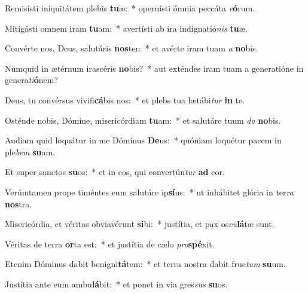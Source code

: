 \item Remisísti iniquitátem plebis \textbf{tu}æ:~* operuísti ómnia peccáta \textit{e}\textbf{ó}rum.
\item Mitigásti omnem iram \textbf{tu}am:~* avertísti ab ira indignatió\textit{nis} \textbf{tu}æ.
\item Convérte nos, Deus, salutáris \textbf{nos}ter:~* et avérte iram tuam \textit{a} \textbf{no}bis.
\item Numquid in ætérnum irascéris \textbf{no}bis?~* aut exténdes iram tuam a generatióne in genera\textit{ti}\textbf{ó}nem?
\item Deus, tu convérsus vivifi\textbf{cá}bis nos:~* et plebs tua lætábi\textit{tur} \textbf{in} te.
\item Osténde nobis, Dómine, misericórdiam \textbf{tu}am:~* et salutáre tuum \textit{da} \textbf{no}bis.
\item Audiam quid loquátur in me Dóminus \textbf{De}us:~* quóniam loquétur pacem in ple\textit{bem} \textbf{su}am.
\item Et super sanctos \textbf{su}os:~* et in eos, qui convertún\textit{tur} \textbf{ad} cor.
\item Verúmtamen prope timéntes eum salutáre ip\textbf{sí}us:~* ut inhábitet glória in ter\textit{ra} \textbf{nos}tra.
\item Misericórdia, et véritas obviavérunt \textbf{si}bi:~* justítia, et pax os\textit{cu}\textbf{lá}tæ sunt.
\item Véritas de terra \textbf{or}ta est:~* et justítia de cælo \textit{pro}\textbf{spé}xit.
\item Etenim Dóminus dabit benigni\textbf{tá}tem:~* et terra nostra dabit fruc\textit{tum} \textbf{su}um.
\item Justítia ante eum ambu\textbf{lá}bit:~* et ponet in via gres\textit{sus} \textbf{su}os.
